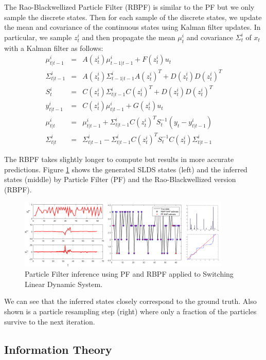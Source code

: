 The Rao-Blackwellized Particle Filter (RBPF) is similar to the PF but we only sample the discrete states. Then for each sample of the discrete states, we update the mean and covariance of the continuous states using Kalman filter updates. In particular, we sample $z_{t}^{i}$ and then propagate the mean $\mu_{t}^{i}$ and covariance $\Sigma_{t}^{i}$ of $x_t$ with a Kalman filter as follows:
\begin{eqnarray}
\mu_{t|t-1}^{i} &=& A(z_{t}^{i})\mu_{t-1|t-1}^{i} + F(z_{t}^{i})u_t\\
\Sigma_{t|t-1}^{i} &=& A(z_{t}^{i})\Sigma_{t-1|t-1}^{i}A(z_{t}^{i})^{T} + D(z_{t}^{i})D(z_{t}^{i})^{T}\\
S_{t}^{i} &=& C(z_{t}^{i})\Sigma_{t|t-1}^{i}C(z_{t}^{i})^{T} + D(z_{t}^{i})D(z_{t}^{i})^{T}\\
y_{t|t-1}^{i} &=& C(z_{t}^{i})\mu_{t|t-1}^{i} + G(z_{t}^{i})u_t\\
\mu_{t|t}^{i} &=& \mu_{t|t-1}^{i} + \Sigma_{t|t-1}^{i}C(z_{t}^{i})^{T}S_{t}^{-1}(y_t - y_{t|t-1}^{i})\\
\Sigma_{t|t}^{i} &=& \Sigma_{t|t-1}^{i} - \Sigma_{t|t-1}^{i}C(z_{t}^{i})^{T}S_{t}^{-1}C(z_{t}^{i})\Sigma_{t|t-1}^{i}
\end{eqnarray}

The RBPF takes slightly longer to compute but results in more accurate predictions. Figure \ref{fig:pf_merged} shows the generated SLDS states (left) and the inferred states (middle) by Particle Filter (PF) and the Rao-Blackwellized version (RBPF).
\begin{figure}[tbhp]
    \centering
    \includegraphics[width=0.9\textwidth, trim={10 10 10 10}]{figures/particle_filter_merged.png}
    \caption{Particle Filter inference using PF and RBPF applied to Switching Linear Dynamic System.}
    \label{fig:pf_merged}
\end{figure}
We can see that the inferred states closely correspond to the ground truth. Also shown is a particle resampling step (right) where only a fraction of the particles survive to the next iteration.


\subsection{Information Theory}

